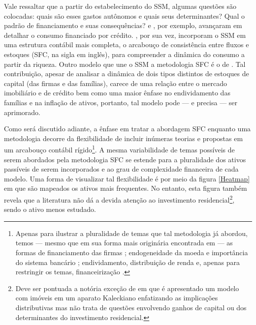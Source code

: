 	
Vale ressaltar que a partir do estabelecimento do SSM, algumas questões são colocadas: quais são esses gastos autônomos e quais seus determinantes? Qual o padrão de financiamento e suas consequências? \textcite{pariboni_household_2016} e \textcite{fagundes_dinamica_2017}, por exemplo, avançaram em detalhar o consumo financiado por crédito.  \textcite{brochier_supermultiplier_2018}, por sua vez, incorporam o SSM em uma estrutura contábil mais completa, o arcabouço de consistência entre fluxos e estoques (SFC, na sigla em inglês), para compreender a dinâmica do consumo a partir da riqueza. Outro modelo que une o SSM a metodologia SFC é o de \textcite{da_silveira_investimento_2019}. Tal contribuição, apesar de analisar a dinâmica de dois tipos distintos de estoques de capital (das firmas e das famílias), carece de uma relação entre o mercado imobiliário e de crédito bem como uma maior ênfase no endividamento das famílias e na inflação de ativos, portanto, tal modelo pode --- e precisa --- ser  aprimorado.


Como será discutido adiante, a ênfase em tratar a abordagem SFC enquanto uma metodologia decorre da flexibilidade de incluir inúmeras teorias e propostas em um arcabouço contábil rígido\footnote{Apenas para ilustrar a pluralidade de temas que tal metodologia já abordou, temos --- mesmo que em sua forma mais originária encontrada em \textcite{godley_macroeconomics_1983} --- as formas de financiamento das firmas \cites{asimakopulos_kalecki_1983}{skott_finance_1988}{messori_financing_1991}; endogeneidade da moeda e importância do sistema bancário \cites{messori_financing_1991}{dow_horizontalism:_1996}{arestis_theoretical_1996}{godley_money_1999}; endividamento, distribuição de renda e, apenas para restringir os temas, financeirização \cites{palley_inside_1996}{wolfson_irving_1996}{palley_money_1997}{palley_financial_2002}{dos_santos_revisiting_2009}{palley_inside_2010}{hein_finance-dominated_2012}.}. 
A mesma variabilidade de temas possíveis de serem abordados pela metodologia SFC se estende para a pluralidade dos ativos passíveis de serem incorporados e ao grau de complexidade financeira de cada modelo. Uma forma de visualizar tal flexibilidade é por meio da figura \ref{Heatmap} em que são mapeados os ativos mais frequentes. No entanto, esta figura também revela que a literatura não dá a devida atenção ao investimento residencial\footnote{Deve ser pontuada a notória exceção de \textcite{zezza_u.s._2008} em que é apresentado um modelo com imóveis em um aparato Kaleckiano enfatizando as implicações distributivas mas não trata de questões envolvendo ganhos de capital ou dos determinantes do investimento residencial.}, sendo o ativo menos estudado. 


